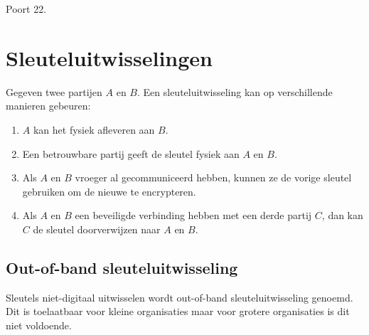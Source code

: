 \documentclass{report}
\begin{document}
\begin{enumerate}
{		}
		                                    
{
		Poort 22.
}


	\end{enumerate}

	\section{Sleuteluitwisselingen}
	Gegeven twee partijen $A$ en $B$. Een sleuteluitwisseling kan op verschillende manieren gebeuren:
	\begin{enumerate}
		\item $A$ kan het fysiek afleveren aan $B$.
		\item Een betrouwbare partij geeft de sleutel fysiek aan $A$ en $B$.
		\item Als $A$ en $B$ vroeger al gecommuniceerd hebben, kunnen ze de vorige sleutel gebruiken om de nieuwe te encrypteren.
		\item Als $A$ en $B$ een beveiligde verbinding hebben met een derde partij $C$, dan kan $C$ de sleutel doorverwijzen naar $A$ en $B$.
	\end{enumerate}
	\subsection{Out-of-band sleuteluitwisseling}
	Sleutels niet-digitaal uitwisselen wordt out-of-band sleuteluitwisseling genoemd. Dit is toelaatbaar voor kleine organisaties maar voor grotere organisaties is dit niet voldoende.
\end{document}
